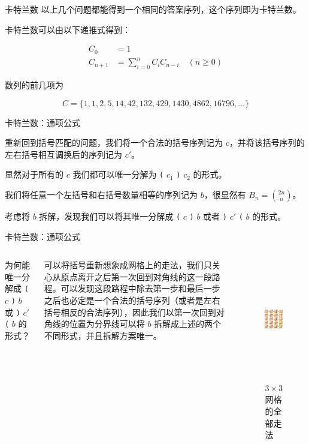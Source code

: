 \documentclass[12pt,aspectratio=169]{beamer}
\begin{document}
\begin{frame}[fragile]{卡特兰数}
以上几个问题都能得到一个相同的答案序列，这个序列即为卡特兰数。

卡特兰数可以由以下递推式得到：

$$
\begin{aligned}
C_{0} &= 1 \\
C_{n+1} &= \sum_{i=0}^{n} C_{i} C_{n-i} \quad (n \ge 0)
\end{aligned}
$$

数列的前几项为

$$
C = \{1, 1, 2, 5, 14, 42, 132, 429, 1430, 4862, 16796, ...\}
$$
\end{frame}

\begin{frame}[fragile]{卡特兰数：通项公式}

重新回到括号匹配的问题，我们将一个合法的括号序列记为 $c$，并将该括号序列的左右括号相互调换后的序列记为 $c'$。

显然对于所有的 $c$ 我们都可以唯一分解为 \verb|(| $c_1$ \verb|)| $c_2$ 的形式。

我们将任意一个左括号和右括号数量相等的序列记为 $b$，很显然有 $B_{n} = {2n \choose n}$。

考虑将 $b$ 拆解，发现我们可以将其唯一分解成 \verb|(| $c$ \verb|)| $b$ 或者 \verb|)| $c'$ \verb|(| $b$ 的形式。
\end{frame}

\begin{frame}[fragile]{卡特兰数：通项公式}
  \begin{columns}[T]
      为何能唯一分解成 \verb|(| $c$ \verb|)| $b$ 或 \verb|)| $c'$ \verb|(| $b$ 的形式？

      \vspace{2em}

      可以将括号重新想象成网格上的走法，我们只关心从原点离开之后第一次回到对角线的这一段路程。可以发现这段路程中除去第一步和最后一步之后也必定是一个合法的括号序列（或者是左右括号相反的合法序列），因此我们以第一次回到对角线的位置为分界线可以将 $b$ 拆解成上述的两个不同形式，并且拆解方案唯一。
      \begin{figure}
        \centering
        \includegraphics[height=150pt]{full_walk.png}
        \caption{$3 \times 3$ 网格的全部走法}
      \end{figure}
  \end{columns}
\end{frame}
\end{document}
